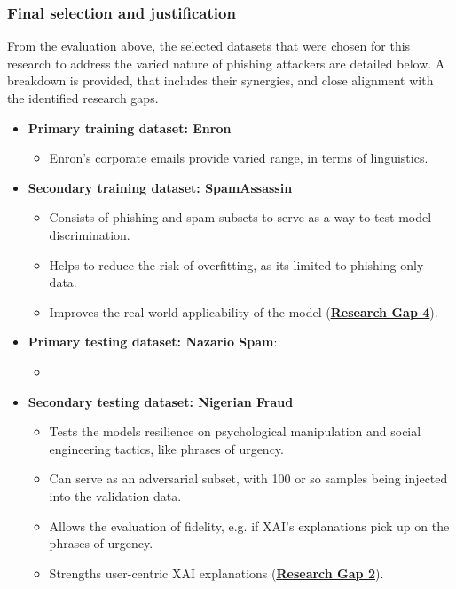 
\subsubsection*{Final selection and justification}
From the evaluation above, the selected datasets that were chosen for this research to address the varied nature of phishing attackers are detailed below. A breakdown is provided, that includes their synergies, and close alignment with the identified research gaps.

\begin{itemize}
  \item \textbf{Primary training dataset: Enron}
  \begin{itemize}
    \item Enron's corporate emails provide varied range, in terms of linguistics.
  \end{itemize}
  \item \textbf{Secondary training dataset: SpamAssassin}
  \begin{itemize}
    \item Consists of phishing and spam subsets to serve as a way to test model discrimination.
    \item Helps to reduce the risk of overfitting, as its limited to phishing-only data.
    \item Improves the real-world applicability of the model (\hyperref[research-gap-4]{\uline{\textbf{Research Gap 4}}}).
  \end{itemize}
\item \textbf{Primary testing dataset: Nazario Spam}:
  \begin{itemize}
    \item 
  \end{itemize}
  \item \textbf{Secondary testing dataset: Nigerian Fraud}
  \begin{itemize}
    \item Tests the models resilience on psychological manipulation and social engineering tactics, like phrases of urgency.
    \item Can serve as an adversarial subset, with 100 or so samples being injected into the validation data.
    \item Allows the evaluation of fidelity, e.g. if XAI's explanations pick up on the phrases of urgency.
    \item Strengths user-centric XAI explanations (\hyperref[research-gap-2]{\uline{\textbf{Research Gap 2}}}).
  \end{itemize}
\end{itemize}

